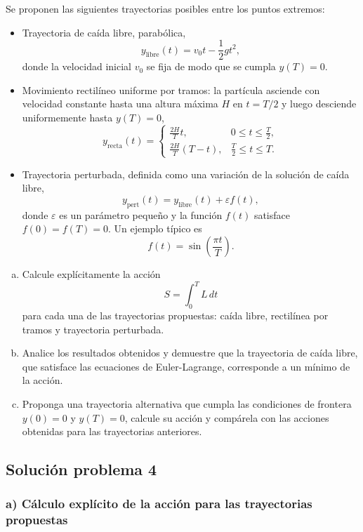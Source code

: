 \documentclass[a4paper]{article}
\begin{document}
Se proponen las siguientes trayectorias posibles entre los puntos extremos:
\begin{itemize}
    \item Trayectoria de caída libre, parabólica,
    $$y_{\text{libre}}(t) = v_0t - \frac{1}{2}gt^2,$$
    donde la velocidad inicial $v_0$ se fija de modo que se cumpla $y(T) = 0$.
    
    \item Movimiento rectilíneo uniforme por tramos: la partícula asciende con velocidad constante hasta una altura máxima $H$ en $t = T/2$ y luego desciende uniformemente hasta $y(T) = 0$,
    $$y_{\text{recta}}(t) = \begin{cases} 
        \frac{2H}{T}t, & 0 \le t \le \frac{T}{2}, \\ 
        \frac{2H}{T}(T - t), & \frac{T}{2} \le t \le T. 
    \end{cases}$$
    
    \item Trayectoria perturbada, definida como una variación de la solución de caída libre,
    $$y_{\text{pert}}(t) = y_{\text{libre}}(t) + \varepsilon f(t),$$
    donde $\varepsilon$ es un parámetro pequeño y la función $f(t)$ satisface $f(0) = f(T) = 0$. Un ejemplo típico es
    $$f(t) = \sin\left(\frac{\pi t}{T}\right).$$
\end{itemize}

\begin{enumerate}[a)]
    \item Calcule explícitamente la acción
    $$S = \int_{0}^{T} L \, dt$$
    para cada una de las trayectorias propuestas: caída libre, rectilínea por tramos y trayectoria perturbada.
    
    \item Analice los resultados obtenidos y demuestre que la trayectoria de caída libre, que satisface las ecuaciones de Euler-Lagrange, corresponde a un mínimo de la acción.
    
    \item Proponga una trayectoria alternativa que cumpla las condiciones de frontera $y(0) = 0$ y $y(T) = 0$, calcule su acción y compárela con las acciones obtenidas para las trayectorias anteriores.
\end{enumerate}

\subsection{Solución problema 4}

\subsubsection*{a) Cálculo explícito de la acción para las trayectorias propuestas}
\end{document}
